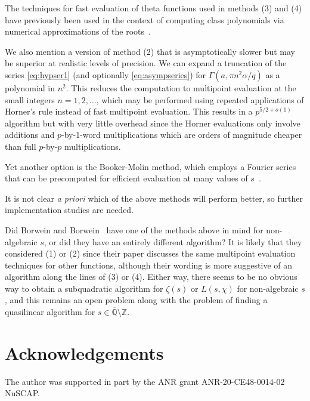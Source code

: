 \documentclass[reqno]{amsart}
\newcommand{\ZZ}{\mathbb{Z}}
\theoremstyle{definition}
\begin{document}
The techniques for fast evaluation of theta functions used in methods (3) and (4)
have previously been used in the context of computing class polynomials
via numerical approximations of the roots~\cite{enge2009complexity}.

We also mention a version of method (2) that is
asymptotically slower but may be superior at realistic levels of precision.
We can expand a truncation of the series \eqref{eq:hypser1} (and optionally \eqref{eq:asympseries})
for $\Gamma(a, \pi n^2 \alpha / q)$ as a polynomial in $n^2$.
This reduces the computation to multipoint evaluation at
the small integers $n = 1, 2, \ldots$,
which may be performed using repeated applications of
Horner's rule instead of fast multipoint evaluation.
This results in a $p^{5/2+o(1)}$ algorithm
but with very little overhead since the Horner evaluations only
involve additions and $p$-by-1-word multiplications
which are orders of magnitude
cheaper than full $p$-by-$p$ multiplications.

Yet another option is the Booker-Molin method, which employs a Fourier series
that can be precomputed for efficient
evaluation at many values of $s$~\cite[\S 9.4]{belabas2021numerical}.

It is not clear \emph{a priori} which of the above methods will perform better,
so further implementation studies are needed.

Did Borwein and Borwein~\cite{Borwein1988}
have one of the methods above in mind for non-algebraic $s$, or did
they have an entirely different algorithm?
It is likely that they considered (1) or (2) since their paper discusses the
same multipoint evaluation techniques for other functions,
although their wording
is more suggestive of an algorithm
along the lines of (3) or (4).
Either way, there seems to be no obvious way to
obtain a subquadratic algorithm for $\zeta(s)$
or $L(s,\chi)$ for non-algebraic $s$,
and this remains an open problem
along with the problem of finding a quasilinear
algorithm for $s \in \overline{\mathbb{Q}} \setminus \ZZ$.

\section*{Acknowledgements}

The author was supported in part by the ANR grant ANR-20-CE48-0014-02 NuSCAP.


%
%


\end{document}
